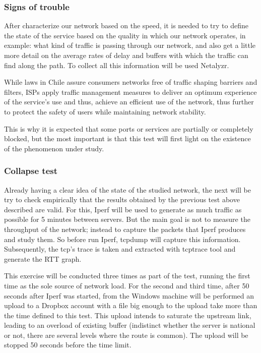\subsubsection{Signs of trouble} 
After characterize our network based on the
speed, it is needed to try to define the state of the service based on the
quality in which our network operates, in example: what kind of traffic is
passing through our network, and also get a little more detail on the
average rates of delay and buffers with which the traffic can find along the
path. To collect all this information will be used Netalyzr. 

While laws in Chile assure consumers networks free of traffic shaping
barriers and filters, ISPs apply traffic management
measures\cite{shapemov}\cite{shapevtr} to deliver an optimum experience of the
service's use and thus, achieve an efficient use of the network, thus further to
protect the safety of users while maintaining network stability.

This is why it is expected that some ports or services are partially or
completely blocked, but the most important is that this test will first light on
the existence of the phenomenon under study.

\subsubsection{Collapse test} 
Already having a clear idea of the state of the studied network, the next will
be try to check empirically that the results obtained by the previous test
above described are valid. For this, Iperf will be used to generate as much
traffic as possible for 5 minutes between servers. But the main goal is not to
measure the throughput of the network; instead to capture the packets that
Iperf produces and study them. So before run Iperf, tcpdump will capture this
information. Subsequently, the tcp's trace is taken and extracted with
tcptrace tool and generate the RTT graph.

This exercise will be conducted three times as part of the test, running the
first time as the sole source of network load. For the second and third time,
after 50 seconds after Iperf was started, from the Windows machine will be 
performed an upload to a Dropbox account with a file big enough to the upload 
take more than the time defined to this test. This upload intends to saturate 
the upstream link, leading to an overload of existing buffer (indistinct 
whether the server is national or not, there are several levels where the 
route is common). The upload will be stopped 50 seconds before the time limit.

